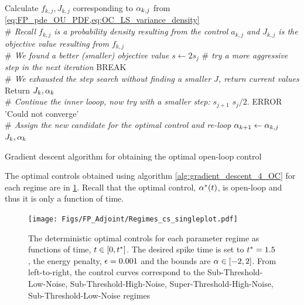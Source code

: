 \documentclass[12pt]{iopart}
\begin{document}
\begin{algorithm}
\begin{algorithmic}
	\State Calculate $f_{k,j}, J_{k,j}$ corresponding to
		${\alpha}_{k,j}$ from	\cref{eq:FP_pde_OU_PDF,eq:OC_LS_variance_density}
	\\ {\itshape $\#$ Recall $f_{k,j}$ is a probability density resulting from the
	control $a_{k,j}$ and $J_{k,j}$ is the objective value resulting from
	$f_{k,j}$}
		\\ {\itshape $\#$ We found a better (smaller) objective value}
		\State $s \gets 2 s_j$ {\itshape $\#$ try a more aggressive step in the
		next iteration}
		\State BREAK
		\EndIf
		\\ {\itshape $\#$ We exhausted the step search without finding a 
		smaller $J$, return current values}
		\State Return $J_k, {\alpha}_k$
	\EndIf
 	\\ {\itshape  $ \#$ Continue the inner looop, now try with a smaller step:}
	 	\State $s_{j+1}$ \gets $s_j / 2.$
		\State ERROR 'Could not converge'
	\EndIf
    \\{\itshape $\#$ Assign the new candidate for the optimal control and
    re-loop}
		\State ${\alpha}_{k+1} \gets {\alpha}_{k,j}$
\State \Return $J_k, {\alpha}_k$
\end{algorithmic}
\caption{ Gradient descent algorithm for obtaining the optimal open-loop 
control}
\label{alg:gradient_descent_4_OC}
\end{algorithm}

The optimal controls obtained using algorithm \ref{alg:gradient_descent_4_OC} for each regime are in
\cref{fig:FBK_Regimes_cs}. Recall that the optimal control, ${\alpha}^*(t)$, is open-loop and thus it is only a function of time.
\begin{figure}[htp]
\begin{center}
  \texttt{[image: Figs/FP\_Adjoint/Regimes\_cs\_singleplot.pdf]}
  \caption[labelInTOC]{The deterministic optimal controls for each parameter
  regime as functions of time, $t \in [0, { t^* }]$.
  The desired spike time is set to ${ t^* }=1.5$, the energy penalty, ${\epsilon}
  = 0.001$ and the bounds are ${\alpha} \in [-2,2]$.
  From left-to-right, the control curves correspond to the
  Sub-Threshold-Low-Noise, Sub-Threshold-High-Noise, Super-Threshold-High-Noise,
  Sub-Threshold-Low-Noise regimes
  }
  \label{fig:FBK_Regimes_cs}
\end{center}  
\end{figure}   
\end{document}
